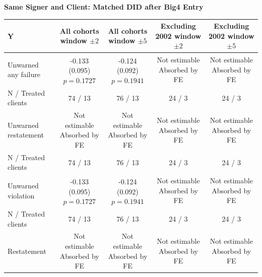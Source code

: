 \documentclass[10pt]{article}
\newcommand{\sym}[1]{\textsuperscript{#1}}
\begin{document}
\fontsize{10}{12}\selectfont\setlength{\parindent}{0pt}
\noindent\textbf{Same Signer and Client: Matched DID after Big4 Entry}\par\medskip
\setlength{\tabcolsep}{3pt}\renewcommand{\arraystretch}{1.15}
\begin{tabular*}{\textwidth}{@{\extracolsep{\fill}}lcccc@{}}
\toprule
Y & \shortstack{All cohorts\\window $\pm2$} & \shortstack{All cohorts\\window $\pm5$} & \shortstack{Excluding 2002\\window $\pm2$} & \shortstack{Excluding 2002\\window $\pm5$} \\
\midrule
Unwarned any failure & \shortstack{-0.133\sym{}\\(0.095)\\$p=0.1727$} & \shortstack{-0.124\sym{}\\(0.092)\\$p=0.1941$} & \shortstack{Not estimable\\Absorbed by FE} & \shortstack{Not estimable\\Absorbed by FE} \\
N / Treated clients & 74 / 13 & 76 / 13 & 24 / 3 & 24 / 3 \\ \addlinespace
Unwarned restatement & \shortstack{Not estimable\\Absorbed by FE} & \shortstack{Not estimable\\Absorbed by FE} & \shortstack{Not estimable\\Absorbed by FE} & \shortstack{Not estimable\\Absorbed by FE} \\
N / Treated clients & 74 / 13 & 76 / 13 & 24 / 3 & 24 / 3 \\ \addlinespace
Unwarned violation & \shortstack{-0.133\sym{}\\(0.095)\\$p=0.1727$} & \shortstack{-0.124\sym{}\\(0.092)\\$p=0.1941$} & \shortstack{Not estimable\\Absorbed by FE} & \shortstack{Not estimable\\Absorbed by FE} \\
N / Treated clients & 74 / 13 & 76 / 13 & 24 / 3 & 24 / 3 \\ \addlinespace
Restatement & \shortstack{Not estimable\\Absorbed by FE} & \shortstack{Not estimable\\Absorbed by FE} & \shortstack{Not estimable\\Absorbed by FE} & \shortstack{Not estimable\\Absorbed by FE} \\

\end{tabular*}
\end{document}
